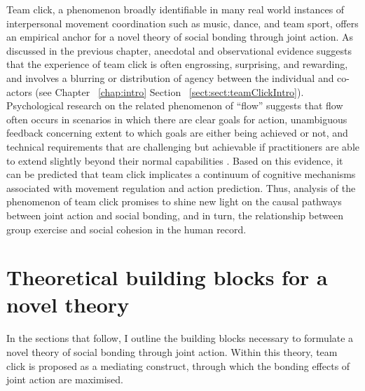 \begin{CJK}{UTF8}{gbsn}
Team click, a phenomenon broadly identifiable in many real world instances of interpersonal movement coordination such as music, dance, and team sport, offers an empirical anchor for a novel theory of social bonding through joint action.  As discussed in the previous chapter, anecdotal and observational evidence suggests that the experience of team click is often engrossing, surprising, and rewarding, and involves a blurring or distribution of agency between the individual and co-actors (see Chapter ~\ref{chap:intro} Section ~\ref{sect:sect:teamClickIntro}).  Psychological research on the related phenomenon of ``flow'' suggests that flow often occurs in scenarios in which there are clear goals for action, unambiguous feedback concerning extent to which goals are either being achieved or not, and technical requirements that are challenging but achievable if practitioners are able to extend slightly beyond their normal capabilities \citep{Csikszentmihalyi1992,Jackson1999,Fong2015}.  Based on this evidence, it can be predicted that team click implicates a continuum of cognitive mechanisms associated with movement regulation and action prediction.  Thus, analysis of the phenomenon of team click
promises to shine new light on the causal pathways between joint action and social bonding, and in turn, the relationship between group exercise and social cohesion in the human record.
















\section{Theoretical building blocks for a novel theory}

In the sections that follow, I outline the building blocks necessary to formulate a novel theory of social bonding through joint action. Within this theory, team click is proposed as a mediating construct, through which the bonding effects of joint action are maximised.


\end{CJK}
